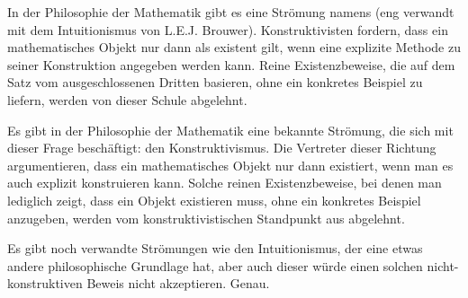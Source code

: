 \begin{didactic-insight}
In der Philosophie der Mathematik gibt es eine Strömung namens  (eng verwandt mit dem Intuitionismus von L.E.J. Brouwer). Konstruktivisten fordern, dass ein mathematisches Objekt nur dann als existent gilt, wenn eine explizite Methode zu seiner Konstruktion angegeben werden kann. Reine Existenzbeweise, die auf dem Satz vom ausgeschlossenen Dritten basieren, ohne ein konkretes Beispiel zu liefern, werden von dieser Schule abgelehnt.
\end{didactic-insight}

\begin{spoken-clean}[00:02:25 - 00:03:12]
Es gibt in der Philosophie der Mathematik eine bekannte Strömung, die sich mit dieser Frage beschäftigt: den Konstruktivismus. Die Vertreter dieser Richtung argumentieren, dass ein mathematisches Objekt nur dann existiert, wenn man es auch explizit konstruieren kann. Solche reinen Existenzbeweise, bei denen man lediglich zeigt, dass ein Objekt existieren muss, ohne ein konkretes Beispiel anzugeben, werden vom konstruktivistischen Standpunkt aus abgelehnt.

Es gibt noch verwandte Strömungen wie den Intuitionismus, der eine etwas andere philosophische Grundlage hat, aber auch dieser würde einen solchen nicht-konstruktiven Beweis nicht akzeptieren. Genau.
\end{spoken-clean}

